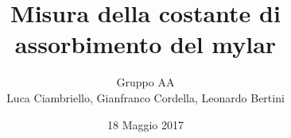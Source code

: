 \documentclass[a4paper,11pt]{article}
\author{Gruppo AA \\ Luca Ciambriello, Gianfranco Cordella, Leonardo Bertini}
\title{Misura della costante di assorbimento del mylar}
\date{18 Maggio 2017}
\newcommand{\insertpart}[2]{}
\begin{document}
\maketitle

\insertpart{parte1}{} 
\insertpart{parte2}{}
\insertpart{immagini}{}
\end{document}

